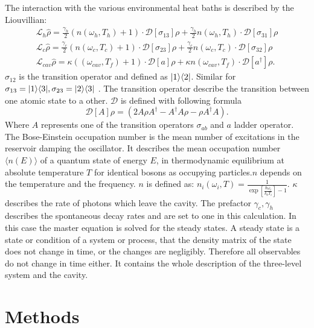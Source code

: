 \documentclass[12pt,a4paper]{article}
\DeclarePairedDelimiter\bra{\langle}{\rvert}
\DeclarePairedDelimiter\ket{\lvert}{\rangle}
\begin{document}
The interaction with the various environmental heat baths is described by the Liouvillian:
\begin{equation}
\begin{aligned}
\mathcal{L}_h\hat{\rho}=\frac{\gamma_h}{2}(n(\omega_h,T_h)+1)   \cdot \mathcal{D}[\sigma_{13}]\rho
+\frac{\gamma_h}{2}n(\omega_h,T_h)\cdot \mathcal{D}[\sigma_{31}]\rho \\
\mathcal{L}_c\hat{\rho}=\frac{\gamma_c}{2}(n(\omega_c,T_c)+1)\cdot \mathcal{D}[\sigma_{23}]\rho
+\frac{\gamma_c}{2}n(\omega_c,T_c) \cdot \mathcal{D}[\sigma_{32}]\rho \\
\mathcal{L}_{cav}\hat{\rho}=\kappa((\omega_{cav},T_f)+1)	\cdot\mathcal{D}[a]\rho+
\kappa n(\omega_{cav},T_f)\cdot \mathcal{D}[a^{\dag}]\rho.
\end{aligned}
\end{equation}
$\sigma_{12} $ is the transition operator and defined as $ \ket{1}\bra{2}$. Similar for $\sigma_{13}=\ket{1}\bra{3}, \sigma_{23}=\ket{2}\bra{3}$ . The transition operator describe the transition between one atomic state to a other.
$\mathcal{D}$ is defined with following formula
\begin{equation}
\mathcal{D}[A]\rho=(2A \rho	A^{\dag}-A^{\dag}A\rho-\rho A^{\dag}A).
\end{equation}
Where $A$ represents one of the transition operators $\sigma_{ab}$ and $a$ ladder operator.
The Bose-Einstein occupation number is the mean number of excitations in the reservoir damping the oscillator. It describes the mean occupation number $\langle n(E) \rangle$ of a quantum state of energy $E$, in thermodynamic equilibrium at absolute temperature $T $ for identical bosons as occupying particles.$ n$ depends on the temperature and the frequency.
$n$ is defined as:
$
n_i(\omega_i,T)=\frac{1}{\exp[\frac{\hbar \omega_i}{k_b T_i}]-1}.
$
$\kappa$ describes the rate of photons which leave the cavity.
The  prefactor $\gamma_c ,\gamma_h$ describes the spontaneous decay rates and are set to one in this calculation.
In this case the master equation is solved for the steady states.
A steady state is a state or condition of a system or process, that the density matrix of the state does not change in time, or the changes are negligibly. Therefore all observables do not change in time either. 
It contains the whole description of the three-level system and the cavity.
\section{Methods}
\end{document}
